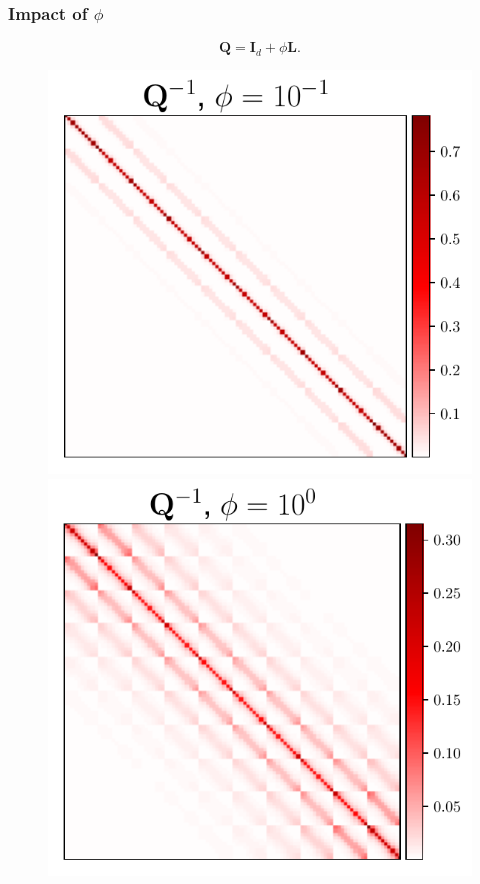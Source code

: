 \documentclass[aspectratio=169]{beamer}
\newcommand{\B}[1]{\mathbf{#1}} %
\begin{document}
\begin{frame}
  \frametitle{Impact of \(\phi\)}
  \[\B{Q} = \B{I}_d + \phi \B{L}.\]
  \begin{figure}
    \mbox{{\includegraphics[scale=0.43]{src/images/simu2_ex1_invA_phi_0.pdf}}}
    \mbox{{\includegraphics[scale=0.43]{src/images/simu2_ex1_invA_phi_1.pdf}}}

\end{figure}
\end{frame}
\end{document}
